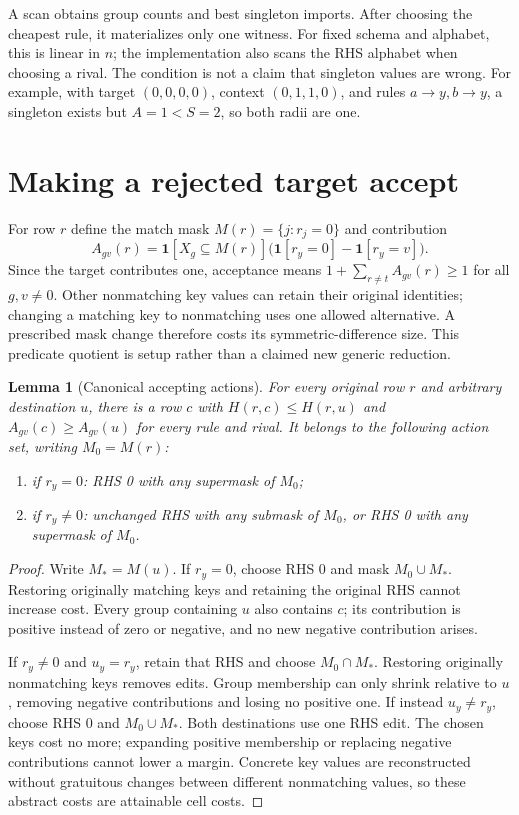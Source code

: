 \documentclass[11pt]{article}
\newtheorem{lemma}{Lemma}
\newcommand{\ind}{\mathbf{1}}
\begin{document}
A scan obtains group counts and best singleton imports. After choosing the
cheapest rule, it materializes only one witness. For fixed schema and alphabet,
this is linear in $n$; the implementation also scans the RHS alphabet when
choosing a rival. The condition is not a claim that singleton values are wrong.
For example, with target $(0,0,0,0)$, context $(0,1,1,0)$, and rules
$a\to y,b\to y$, a singleton exists but $A=1<S=2$, so both radii are one.

\section{Making a rejected target accept}
For row $r$ define the match mask $M(r)=\{j:r_j=0\}$ and contribution
\[
 A_{gv}(r)=\ind[X_g\subseteq M(r)]
           \bigl(\ind[r_y=0]-\ind[r_y=v]\bigr).
\]
Since the target contributes one, acceptance means
$1+\sum_{r\ne t}A_{gv}(r)\geq1$ for all $g,v\ne0$.
Other nonmatching key values can retain their original identities; changing a
matching key to nonmatching uses one allowed alternative. A prescribed mask
change therefore costs its symmetric-difference size. This predicate quotient
is setup rather than a claimed new generic reduction.

\begin{lemma}[Canonical accepting actions]\label{lem:dominance}
For every original row $r$ and arbitrary destination $u$, there is a row $c$
with $H(r,c)\leq H(r,u)$ and $A_{gv}(c)\geq A_{gv}(u)$ for every rule and rival.
It belongs to the following action set, writing $M_0=M(r)$:
\begin{enumerate}
\item if $r_y=0$: RHS 0 with any supermask of $M_0$;
\item if $r_y\ne0$: unchanged RHS with any submask of $M_0$, or RHS 0 with any
supermask of $M_0$.
\end{enumerate}
\end{lemma}
\begin{proof}
Write $M_*=M(u)$. If $r_y=0$, choose RHS 0 and mask $M_0\cup M_*$.
Restoring originally matching keys and retaining the original RHS cannot
increase cost. Every group containing $u$ also contains $c$; its contribution
is positive instead of zero or negative, and no new negative contribution arises.

If $r_y\ne0$ and $u_y=r_y$, retain that RHS and choose $M_0\cap M_*$.
Restoring originally nonmatching keys removes edits. Group membership can only
shrink relative to $u$, removing negative contributions and losing no positive
one. If instead $u_y\ne r_y$, choose RHS 0 and $M_0\cup M_*$.
Both destinations use one RHS edit. The chosen keys cost no more; expanding
positive membership or replacing negative contributions cannot lower a margin.
Concrete key values are reconstructed without gratuitous changes between
different nonmatching values, so these abstract costs are attainable cell costs.
\end{proof}
\end{document}

